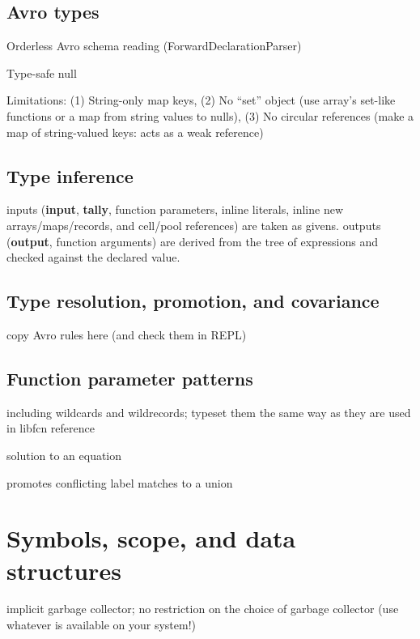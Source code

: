 \documentclass{article}
\newcommand{\PFAc}{\ttfamily\bfseries}
\theoremstyle{definition}
\begin{document}
\hypertarget{hsec:avro-types}{}
\subsection{Avro types}
\label{sec:avro-types}

Orderless Avro schema reading (ForwardDeclarationParser)

Type-safe null

Limitations: (1) String-only map keys, (2) No ``set'' object (use array's set-like functions or a map from string values to nulls), (3) No circular references (make a map of string-valued keys: acts as a weak reference)

\hypertarget{hsec:type-inference}{}
\subsection{Type inference}
\label{sec:type-inference}

inputs ({\PFAc input}, {\PFAc tally}, function parameters, inline literals, inline new arrays/maps/records, and cell/pool references) are taken as givens.  outputs ({\PFAc output}, function arguments) are derived from the tree of expressions and checked against the declared value.

\subsection{Type resolution, promotion, and covariance}

copy Avro rules here (and check them in REPL)

\subsection{Function parameter patterns}

including wildcards and wildrecords; typeset them the same way as they are used in libfcn reference

solution to an equation

promotes conflicting label matches to a union

\pagebreak

\section{Symbols, scope, and data structures}

implicit garbage collector; no restriction on the choice of garbage collector (use whatever is available on your system!)
\end{document}
